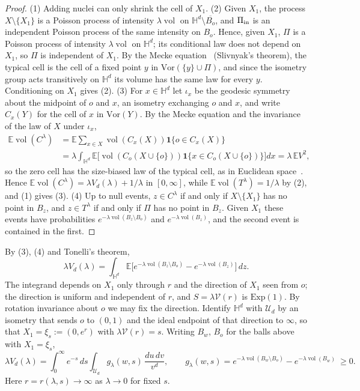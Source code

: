 \documentclass[11pt]{amsart}
\theoremstyle{remark}
\newcommand{\HH}{\mathbb{H}}
\newcommand{\E}{\mathbb{E}}
\newcommand{\vol}{\operatorname{vol}}
\begin{document}
\begin{proof}
(1) Adding nuclei can only shrink the cell of $X_1$. (2) Given $X_1$, the process $X\setminus\{X_1\}$ is a Poisson
process of intensity $\lambda\vol$ on $\HH^d\setminus\overline{B_o}$, and $\Pi_{\rm in}$ is an independent Poisson
process of the same intensity on $B_o$. Hence, given $X_1$, $\Pi$ is a Poisson process of intensity $\lambda\vol$ on
$\HH^d$; its conditional law does not depend on $X_1$, so $\Pi$ is independent of $X_1$. By the Mecke equation~\cite[Theorem~4.1]{LP}
(Slivnyak's theorem), the typical cell is the cell of a fixed point $y$ in $\mathrm{Vor}(\{y\}\cup\Pi)$,
and since the isometry group acts transitively on $\HH^d$ its volume has the same law for every $y$. Conditioning on
$X_1$ gives (2). (3) For $x\in\HH^d$ let $\iota_x$ be the geodesic symmetry about the midpoint of $o$ and $x$, an
isometry exchanging $o$ and $x$, and write $C_x(Y)$ for the cell of $x$ in $\mathrm{Vor}(Y)$. By the Mecke equation and
the invariance of the law of $X$ under $\iota_x$,
\begin{align*}
\E\vol(C^\lambda)&=\E\sum_{x\in X}\vol(C_x(X))\mathbf 1\{o\in C_x(X)\}\\
&=\lambda\int_{\HH^d}\E\bigl[\vol(C_o(X\cup\{o\}))\mathbf 1\{x\in C_o(X\cup\{o\})\}\bigr]dx=\lambda\,\E V^2,
\end{align*}
so the zero cell has the size-biased law of the typical cell, as in Euclidean space~\cite[Section~10.4]{SW}. Hence
$\E\vol(C^\lambda)=\lambda V_d(\lambda)+1/\lambda$ in $[0,\infty]$, while $\E\vol(T^\lambda)=1/\lambda$ by (2), and (1)
gives (3). (4) Up to null events, $z\in C^\lambda$ if and only if $X\setminus\{X_1\}$
has no point in $B_z$, and $z\in T^\lambda$ if and only if $\Pi$ has no point in $B_z$. Given $X_1$ these events have
probabilities $e^{-\lambda\vol(B_z\setminus B_o)}$ and $e^{-\lambda\vol(B_z)}$, and the second event is contained in the
first.
\end{proof}

By (3), (4) and Tonelli's theorem,
\[
\lambda V_d(\lambda)=\int_{\HH^d}\E\bigl[e^{-\lambda\vol(B_z\setminus B_o)}-e^{-\lambda\vol(B_z)}\bigr]\,dz .
\]
The integrand depends on $X_1$ only through $r$ and the direction of $X_1$ seen from $o$; the direction is uniform and
independent of $r$, and $S=\lambda\mathcal V(r)$ is $\mathrm{Exp}(1)$. By rotation invariance about $o$ we may fix the
direction. Identify $\HH^d$ with $\mathcal U_d$ by an isometry that sends $o$ to $(0,1)$ and the ideal endpoint of that
direction to $\infty$, so that $X_1=\xi_s:=(0,e^{r})$ with $\lambda\mathcal V(r)=s$. Writing $B_w$, $B_o$ for the balls
above with $X_1=\xi_s$,
\begin{equation}\label{eq:finite-integral}
\lambda V_d(\lambda)=\int_0^\infty e^{-s}\,ds\int_{\mathcal U_d}g_\lambda(w,s)\,\frac{du\,dv}{v^d},\qquad
g_\lambda(w,s)=e^{-\lambda\vol(B_w\setminus B_o)}-e^{-\lambda\vol(B_w)}\ \ge0 .
\end{equation}
Here $r=r(\lambda,s)\to\infty$ as $\lambda\to0$ for fixed $s$.
\end{document}
